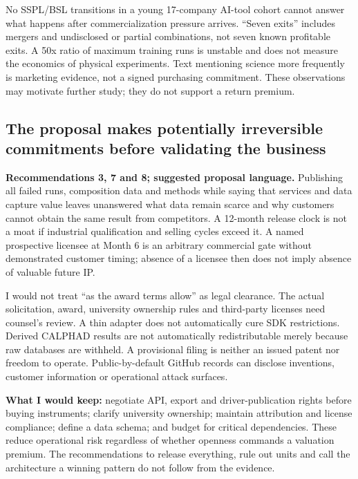 \documentclass{article}
\begin{document}
No SSPL/BSL transitions in a young 17-company AI-tool cohort cannot
answer what happens after commercialization pressure arrives. ``Seven
exits'' includes mergers and undisclosed or partial combinations, not
seven known profitable exits. A 50x ratio of maximum training runs is
unstable and does not measure the economics of physical experiments.
Text mentioning science more frequently is marketing evidence, not a
signed purchasing commitment. These observations may motivate further
study; they do not support a return premium.

\subsection{The proposal makes potentially irreversible commitments
before validating the
business}\label{the-proposal-makes-potentially-irreversible-commitments-before-validating-the-business}

\textbf{Recommendations 3, 7 and 8; suggested proposal language.}
Publishing all failed runs, composition data and methods while saying
that services and data capture value leaves unanswered what data remain
scarce and why customers cannot obtain the same result from competitors.
A 12-month release clock is not a moat if industrial qualification and
selling cycles exceed it. A named prospective licensee at Month 6 is an
arbitrary commercial gate without demonstrated customer timing; absence
of a licensee then does not imply absence of valuable future IP.

I would not treat ``as the award terms allow'' as legal clearance. The
actual solicitation, award, university ownership rules and third-party
licenses need counsel's review. A thin adapter does not automatically
cure SDK restrictions. Derived CALPHAD results are not automatically
redistributable merely because raw databases are withheld. A provisional
filing is neither an issued patent nor freedom to operate.
Public-by-default GitHub records can disclose inventions, customer
information or operational attack surfaces. \citep{InputProposal}

\textbf{What I would keep:} negotiate API, export and driver-publication
rights before buying instruments; clarify university ownership; maintain
attribution and license compliance; define a data schema; and budget for
critical dependencies. These reduce operational risk regardless of
whether openness commands a valuation premium. The recommendations to
release everything, rule out units and call the architecture a winning
pattern do not follow from the evidence.
\end{document}

